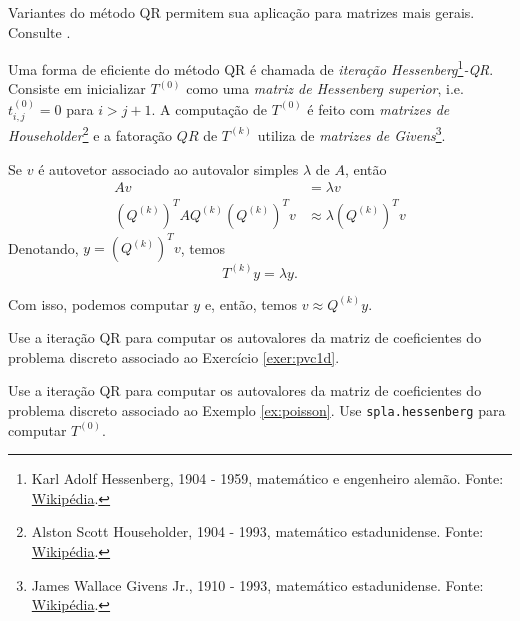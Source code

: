 \begin{obs}
  Variantes do método QR permitem sua aplicação para matrizes mais gerais. Consulte \cite{Golub2013a}.
\end{obs}

Uma forma de eficiente do método QR é chamada de \emph{iteração Hessenberg}\footnote{Karl Adolf Hessenberg, 1904 - 1959, matemático e engenheiro alemão. Fonte: \href{https://pt.wikipedia.org/wiki/Karl_Hessenberg}{Wikipédia}.}\emph{-QR}. Consiste em inicializar $T^{(0)}$ como uma \emph{matriz de Hessenberg superior}, i.e. $t^{(0)}_{i,j}=0$ para $i>j+1$. A computação de $T^{(0)}$ é feito com \emph{matrizes de Householder}\footnote{Alston Scott Householder, 1904 - 1993, matemático estadunidense. Fonte: \href{https://pt.wikipedia.org/wiki/Alston_Scott_Householder}{Wikipédia}.} e a fatoração $QR$ de $T^{(k)}$ utiliza de \emph{matrizes de Givens}\footnote{James Wallace Givens Jr., 1910 - 1993, matemático estadunidense. Fonte: \href{https://pt.wikipedia.org/wiki/Wallace_Givens}{Wikipédia}.}.

\begin{obs}
  Se $v$ é autovetor associado ao autovalor simples $\lambda$ de $A$, então
  \begin{align}
    Av &= \lambda v\\
    (Q^{(k)})^TAQ^{(k)}(Q^{(k)})^Tv &\approx \lambda (Q^{(k)})^Tv
  \end{align}
  Denotando, $y = (Q^{(k)})^Tv$, temos
  \begin{equation}
    T^{(k)}y = \lambda y.
  \end{equation}

  Com isso, podemos computar $y$ e, então, temos $v\approx Q^{(k)}y$.
\end{obs}


\begin{exer}
  Use a iteração QR para computar os autovalores da matriz de coeficientes do problema discreto associado ao Exercício \ref{exer:pvc1d}.
\end{exer}

\begin{exer}
  Use a iteração QR para computar os autovalores da matriz de coeficientes do problema discreto associado ao Exemplo \ref{ex:poisson}. Use \lstinline+spla.hessenberg+ para computar $T^{(0)}$.
\end{exer}
